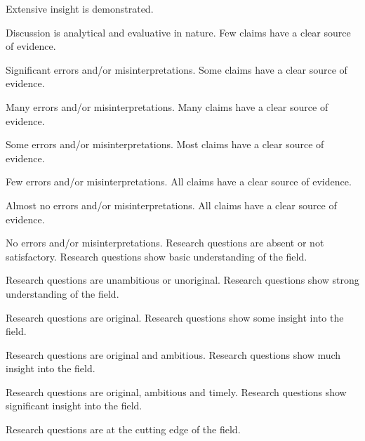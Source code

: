 \begin{markingrubric}
        \grade		Extensive insight is demonstrated.
        \par		Discussion is analytical and evaluative in nature.
        \grade\fail 	Few claims have a clear source of evidence.
        \par 		Significant errors and/or misinterpretations.
        \grade 		Some claims have a clear source of evidence.
        \par 		Many errors and/or misinterpretations.
        \grade 		Many claims have a clear source of evidence.
        \par 		Some errors and/or misinterpretations.
        \grade 		Most claims have a clear source of evidence.
        \par 		Few errors and/or misinterpretations.
        \grade 		All claims have a clear source of evidence.
        \par 		Almost no errors and/or misinterpretations.
        \grade 		All claims have a clear source of evidence.
        \par 		No errors and/or misinterpretations.
        \grade\fail 	Research questions are absent or not satisfactory.
        \grade 		Research questions show basic understanding of the field.
        \par		Research questions are unambitious or unoriginal.
        \grade 		Research questions show strong understanding of the field.
        \par		Research questions are original.
        \grade 		Research questions show some insight into the field.
        \par		Research questions are original and ambitious.
        \grade 		Research questions show much insight into the field.
        \par		Research questions are original, ambitious and timely.
        \grade 		Research questions show significant insight into the field.
        \par		Research questions are at the cutting edge of the field.
\end{markingrubric}
    
